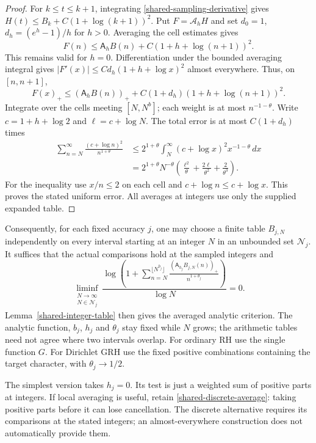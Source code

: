 \begin{proof}
For $k\le t\le k+1$, integrating
\eqref{shared-sampling-derivative} gives
$H(t)\le B_k+C(1+\log(k+1))^2$.
Put $F=\mathcal A_hH$ and set $d_0=1$,
$d_h=(e^h-1)/h$ for $h>0$. Averaging the cell estimates gives
\[
 F(n)\le\mathsf A_hB(n)+C(1+h+\log(n+1))^2.
\]
This remains valid for $h=0$. Differentiation under the bounded
averaging integral gives
$|F'(x)|\le Cd_h(1+h+\log x)^2$ almost everywhere. Thus, on
$[n,n+1]$,
\[
 F(x)_+\le(\mathsf A_hB(n))_+
                  +C(1+d_h)(1+h+\log(n+1))^2.
\]
Integrate over the cells meeting $[N,N^b]$; each weight is at most
$n^{-1-\theta}$. Write $c=1+h+\log2$ and $\ell=c+\log N$.
The total error is at most $C(1+d_h)$ times
\[
 \begin{split}
 \sum_{n=N}^{\infty}\frac{(c+\log n)^2}{n^{1+\theta}}
 &\le 2^{1+\theta}\int_N^\infty
                 (c+\log x)^2x^{-1-\theta}\,dx\\
 &=2^{1+\theta}N^{-\theta}
    \left(\frac{\ell^2}{\theta}
          +\frac{2\ell}{\theta^2}+\frac2{\theta^3}\right).
 \end{split}
\]
For the inequality use $x/n\le2$ on each cell and
$c+\log n\le c+\log x$. This proves the stated uniform error.
All averages at integers use only the supplied expanded table.
\end{proof}

Consequently, for each fixed accuracy $j$, one may choose a finite
table $B_{j,N}$ independently on every interval starting at an integer
$N$ in an unbounded set $\mathcal N_j$. It suffices that the actual
comparisons hold at the sampled integers and
\begin{equation}\label{shared-finite-criterion}
 \liminf_{\substack{N\to\infty\\N\in\mathcal N_j}}
 \frac{\log\left(1+\displaystyle
  \sum_{n=N}^{\lfloor N^{b_j}\rfloor}
  \frac{(\mathsf A_{h_j}B_{j,N}(n))_+}{n^{1+\theta_j}}\right)}
 {\log N}=0.
\end{equation}
Lemma~\ref{shared-integer-table} then gives the averaged analytic
criterion. The analytic function, $b_j$, $h_j$ and $\theta_j$ stay
fixed while $N$ grows; the arithmetic tables need not agree where
two intervals overlap. For ordinary RH use the single function $G$.
For Dirichlet GRH use the fixed positive combinations containing the
target character, with $\theta_j\to1/2$.

The simplest version takes $h_j=0$. Its test is just a weighted sum
of positive parts at integers. If local averaging is useful, retain
\eqref{shared-discrete-average}: taking positive parts before it can
lose cancellation. The discrete alternative requires its comparisons
at the stated integers; an almost-everywhere construction does not
automatically provide them.
